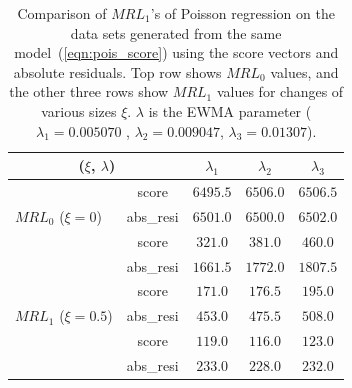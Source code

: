 \documentclass[twoside,11pt]{article}
\begin{document}
\begin{appendices}
\begin{table}[H]
\centering
\begin{tabular}{lc|ccc}
\toprule
\multicolumn{2}{c|}{($ \xi$, $ \lambda$)} & {$ \lambda_1$} & {$ \lambda_2$} & {$ \lambda_3$} \\
\toprule
\multirow{3}{*}{$MRL_0$ ($\xi=0$)} & score &$6495.5$ & $6506.0$ & $6506.5$ \\
& abs\_resi &$6501.0$ & $6500.0$ & $6502.0$ \\
\midrule
\midrule
\multirow{3}{*}{$MRL_1$ ($\xi=0.3$)} & score &$\bm{321.0}$ & $\bm{381.0}$ & $\bm{460.0}$ \\
& abs\_resi &$1661.5$ & $1772.0$ & $1807.5$ \\
\midrule
\multirow{3}{*}{$MRL_1$ ($\xi=0.5$)} & score &$\bm{171.0}$ & $\bm{176.5}$ & $\bm{195.0}$ \\
& abs\_resi &$453.0$ & $475.5$ & $508.0$ \\
\midrule
\multirow{3}{*}{$MRL_1$ ($\xi=0.7$)} & score &$\bm{119.0}$ & $\bm{116.0}$ & $\bm{123.0}$ \\
& abs\_resi &$233.0$ & $228.0$ & $232.0$ \\
\midrule
\end{tabular}
\caption{Comparison of $MRL_1$'s of Poisson regression on the data sets generated from the same model~(\ref{eqn:pois_score}) using the score vectors and absolute residuals. Top row shows $MRL_0$ values, and the other three rows show $MRL_1$ values for changes of various sizes $\xi$. $ \lambda$ is the EWMA parameter ({$ \lambda_1=0.005070$} , {$ \lambda_2=0.009047$}, {$ \lambda_3=0.01307$}).}
\label{tab:pois_MRL}
\end{table}


\end{appendices}
\end{document}
